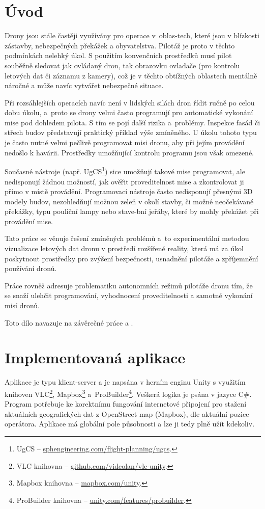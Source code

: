 \documentclass[czech]{ExcelAtFIT} %
\affiliation{*%
  \href{mailto:xkomar33@vut.cz}{xkomar33@vut.cz},
  \textit{Fakulta informačních technologií, Vysoké učení technické v Brně}}
\begin{document}
\startdocument

\section{Úvod}
Drony jsou stále častěji využívány pro operace v~oblas-tech, které jsou v blízkosti zástavby, nebezpečných překážek a obyvatelstva. Pilotáž je proto  v těchto podmínkách nelehký úkol. S použitím konvenčních prostředků musí pilot souběžně sledovat jak ovládaný dron, tak obrazovku ovladače (pro kontrolu letových dat či záznamu z kamery), což je v těchto obtížných oblastech mentálně náročné a může navíc vytvářet nebezpečné situace.

Při rozsáhlejších operacích navíc není v lidských silách dron řídit ručně po celou dobu úkolu, a~proto se drony velmi často programují pro automatické vykonání mise pod dohledem pilota. S tím se pojí další rizika a~problémy. Inspekce fasád či střech budov představují praktický příklad výše zmíněného. U úkolu tohoto typu je často nutné velmi pečlivě programovat misi dronu, aby při jejím provádění nedošlo k havárii. Prostředky umožňující kontrolu programu jsou však omezené. 

Současné nástroje (např. UgCS\footnote{UgCS -- \href{https://www.sphengineering.com/flight-planning/ugcs}{sphengineering.com/flight-planning/ugcs}.}) sice umožňují takové mise programovat, ale nedisponují žádnou možností, jak ověřit proveditelnost mise a zkontrolovat ji přímo v místě provádění. Programovací nástroje často nedisponují přesnými 3D modely budov, nezohledňují možnou zeleň v okolí stavby, či možné neočekávané překážky, typu pouliční lampy nebo stave-bní jeřáby, které by mohly překážet při provádění mise.

Tato práce se věnuje řešení zmíněných problémů a~to experimentální metodou vizualizace letových dat dronu v prostředí rozšířené reality, která má za úkol poskytnout prostředky pro zvýšení bezpečnosti, usnadnění pilotáže a zpříjemnění používání dronů. 

Práce rovněž adresuje problematiku autonomních režimů pilotáže dronu tím, že se snaží  ulehčit programování, vyhodnocení proveditelnosti a samotné vykonání misí dronů. 

Toto dílo navazuje na závěrečné práce \cite{VáclavíkMarek2021Vnpp} a \cite{KyjacMartin2022Vnpp}.


\section{Implementovaná aplikace}
Aplikace je typu klient-server a je napsána v herním enginu Unity s využitím knihoven VLC\footnote{VLC knihovna -- \href{https://github.com/videolan/vlc-unity}{github.com/videolan/vlc-unity}.}, Mapbox\footnote{Mapbox knihovna -- \href{https://www.mapbox.com/unity}{mapbox.com/unity}.} a~ProBuilder\footnote{ProBuilder knihovna -- \href{https://unity.com/features/probuilder}{unity.com/features/probuilder}.}. Veškerá logika je psána v jazyce C\#. Program potřebuje ke korektnímu fungování internetové připojení pro stažení aktuálních geografických dat z OpenStreet map (Mapbox), dle aktuální pozice operátora. Aplikace má globální pole působnosti a lze ji tedy plně užít kdekoliv. 
\end{document}
